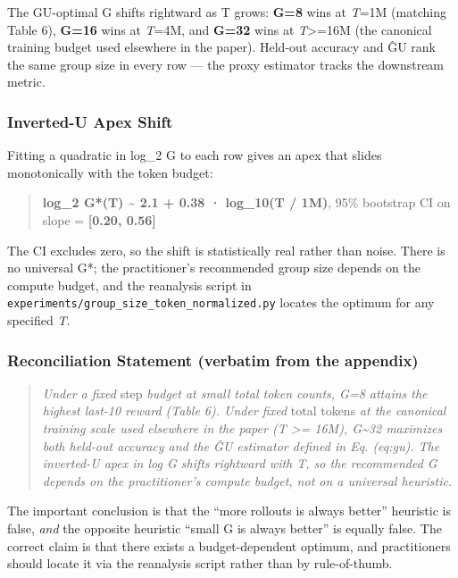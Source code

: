 \documentclass[
  american,
  11pt,
  a4paper,
  oneside]{report}
\begin{document}
The GU-optimal G shifts rightward as T grows: \textbf{G=8} wins at
\emph{T}=1M (matching Table 6), \textbf{G=16} wins at \emph{T}=4M, and
\textbf{G=32} wins at \emph{T}\textgreater=16M (the canonical training
budget used elsewhere in the paper). Held-out accuracy and ĜU rank the
same group size in every row --- the proxy estimator tracks the
downstream metric.

\subsubsection{Inverted-U Apex Shift}\label{inverted-u-apex-shift}

Fitting a quadratic in log\_2 G to each row gives an apex that slides
monotonically with the token budget:

\begin{quote}
\textbf{log\_2 G*(T) \textasciitilde{} 2.1 + 0.38 · log\_10(T / 1M)},
95\% bootstrap CI on slope = \textbf{{[}0.20, 0.56{]}}
\end{quote}

The CI excludes zero, so the shift is statistically real rather than
noise. There is no universal G*; the practitioner's recommended group
size depends on the compute budget, and the reanalysis script in
\texttt{experiments/group\_size\_token\_normalized.py} locates the
optimum for any specified \emph{T}.

\subsubsection{Reconciliation Statement (verbatim from the
appendix)}\label{reconciliation-statement-verbatim-from-the-appendix}

\begin{quote}
\emph{Under a fixed} step \emph{budget at small total token counts, G=8
attains the highest last-10 reward (Table 6). Under fixed} total tokens
\emph{at the canonical training scale used elsewhere in the paper (T
\textgreater= 16M), G\textasciitilde32 maximizes both held-out accuracy
and the ĜU estimator defined in Eq. (eq:gu). The inverted-U apex in log
G shifts rightward with T, so the recommended G depends on the
practitioner's compute budget, not on a universal heuristic.}
\end{quote}

The important conclusion is that the ``more rollouts is always better''
heuristic is false, \emph{and} the opposite heuristic ``small G is
always better'' is equally false. The correct claim is that there exists
a budget-dependent optimum, and practitioners should locate it via the
reanalysis script rather than by rule-of-thumb.
\end{document}
